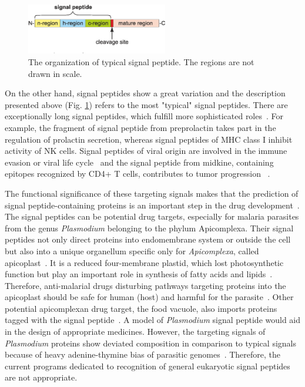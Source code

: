 \documentclass[10pt,letterpaper]{article}
\begin{document}
\begin{figure}[ht]\centering
\includegraphics[width=0.55\textwidth]{figures/SP.eps}
\caption{The organization of typical signal peptide. The regions are not drawn in scale.}
\label{fig:sparch}
\end{figure}

On the other hand, signal peptides show a great variation and the description presented above (Fig. \ref{fig:sparch}) refers to the most "typical" signal peptides. There are  exceptionally long signal peptides, which fulfill more sophisticated roles~\cite{2009hissarchitecture}. For example, the fragment of signal peptide from preprolactin takes part in the regulation of prolactin secretion, whereas signal peptides of MHC class I inhibit activity of NK cells. Signal peptides of viral origin are involved in the immune evasion or viral life cycle~\cite{2000kappposttargeting} and the signal peptide from midkine, containing epitopes recognized by CD4+ T cells, contributes to tumor progression ~\cite{2013kerzerhothe}. 

The functional significance of these targeting signals makes that the prediction of signal peptide-containing proteins is an important step in the drug development~\cite{2005zhangalteration, 2012netoadeimproving, 2010moellerwetmilling}. The signal peptides can be  potential drug targets, especially for malaria parasites from the genus \textit{Plasmodium} belonging to the phylum Apicomplexa. Their signal peptides not only direct proteins into endomembrane system or outside the cell but also into a unique organellum specific only for \textit{Apicomplexa}, called apicoplast~\cite{2003foththe, Lim2010, McFadden, Heiny2014}. It is a reduced four-membrane plastid, which lost photosynthetic function but play an important role in synthesis of fatty acids and lipids~\cite{Lim2010, McFadden, Mazumdar2006}. Therefore, anti-malarial drugs disturbing pathways targeting proteins into the apicoplast should be safe for human (host) and harmful for the parasite~\cite{1997ficheraa, ralph, 2003gornickiapicoplast, 2010garciaestradadna}. Other potential apicomplexan drug target, the food vacuole, also imports proteins tagged with the signal peptide~\cite{2002egandiscovering}. A model of \textit{Plasmodium} signal peptide would aid in the design of appropriate medicines. However, the targeting signals of \textit{Plasmodium} proteins show deviated composition in comparison to typical signals because of heavy adenine-thymine bias of parasitic genomes~\cite{Tonkin2008a}. Therefore, the current programs dedicated to recognition of general eukaryotic signal peptides are not appropriate.
\end{document}
